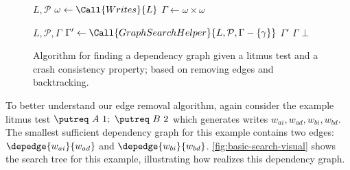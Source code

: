 

\begin{figure}[h]
\begin{algorithmic}[1]
    {$L, \mathcal{P}$} 
    \State $\omega \gets \Call{Writes}{L}$ 
    \State $\Gamma \gets \omega \times \omega$ 
    \State \Return {}
  \EndFunction

    {$L, \mathcal{P}, \Gamma$} 
    \For{$\gamma\in\Gamma$}
      \State $\Gamma' \gets \Call{GraphSearchHelper}{L, \mathcal{P}, \Gamma - \{\gamma\}}$
        \State \Return $\Gamma'$
      \EndIf
    \EndFor
      \State \Return $\Gamma$
    \EndIf
    \State \Return $\bot$
  \EndFunction
\end{algorithmic}
\caption{Algorithm for finding a dependency graph given a litmus test and a crash consistency
property; based on removing edges and backtracking.\tighten}
\label{alg:remove-edges}
\end{figure}

To better understand our edge removal algorithm, again consider the example
litmus test $ \putreq\ A\ 1;\ \putreq\ B\ 2$
which generates writes $w_{ai}, w_{ad}, w_{bi}, w_{bd}$.
The smallest sufficient dependency graph for this example contains two edges:
$\depedge{w_{ai}}{w_{ad}}$ and $\depedge{w_{bi}}{w_{bd}}$.
\autoref{fig:basic-search-visual} shows the search tree for this example,
illustrating how \graphsearch realizes this dependency graph.

